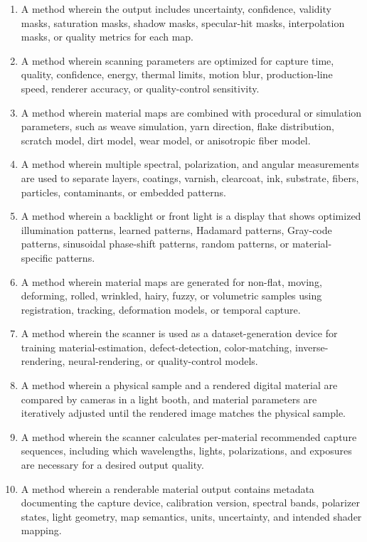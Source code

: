 \documentclass[11pt, twoside, listof=totocnumbered, bibliography=totocnumbered]{scrartcl}
\begin{document}
\begin{enumerate}
		\item A method wherein the output includes uncertainty, confidence, validity masks, saturation masks, shadow masks, specular-hit masks, interpolation masks, or quality metrics for each map.
		
		\item A method wherein scanning parameters are optimized for capture time, quality, confidence, energy, thermal limits, motion blur, production-line speed, renderer accuracy, or quality-control sensitivity.
		
		\item A method wherein material maps are combined with procedural or simulation parameters, such as weave simulation, yarn direction, flake distribution, scratch model, dirt model, wear model, or anisotropic fiber model.
		
		\item A method wherein multiple spectral, polarization, and angular measurements are used to separate layers, coatings, varnish, clearcoat, ink, substrate, fibers, particles, contaminants, or embedded patterns.
		
		\item A method wherein a backlight or front light is a display that shows optimized illumination patterns, learned patterns, Hadamard patterns, Gray-code patterns, sinusoidal phase-shift patterns, random patterns, or material-specific patterns.
		
		\item A method wherein material maps are generated for non-flat, moving, deforming, rolled, wrinkled, hairy, fuzzy, or volumetric samples using registration, tracking, deformation models, or temporal capture.
		
		\item A method wherein the scanner is used as a dataset-generation device for training material-estimation, defect-detection, color-matching, inverse-rendering, neural-rendering, or quality-control models.
		
		\item A method wherein a physical sample and a rendered digital material are compared by cameras in a light booth, and material parameters are iteratively adjusted until the rendered image matches the physical sample.
		
		\item A method wherein the scanner calculates per-material recommended capture sequences, including which wavelengths, lights, polarizations, and exposures are necessary for a desired output quality.
		
		\item A method wherein a renderable material output contains metadata documenting the capture device, calibration version, spectral bands, polarizer states, light geometry, map semantics, units, uncertainty, and intended shader mapping.
	\end{enumerate}
	
\end{document}
